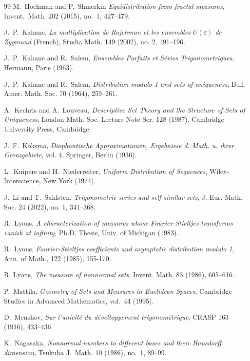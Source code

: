 \documentclass[12pt, twoside]{article}
\theoremstyle{definition}
\numberwithin{equation}{section}
\begin{document}
\begin{thebibliography}{99}
M.~Hochman and P.~Shmerkin 
{\em{Equidistribution from fractal measures}}, 
Invent.~Math. 202 (2015), no.~1, 427--479.  

J.~P.~Kahane, 
{\em{La multiplication de Rajchman et les ensembles $U(\varepsilon)$ de Zygmund}} (French),
Studia Math. 149 (2002), no. 2, 191--196. 

J.~P.~Kahane and R.~Salem,
{\em{Ensembles Parfaits et S\'eries Trigonometriques}}, 
Hermann, Paris (1963). 

J.~P.~Kahane and R.~Salem, 
{\em{Distribution modulo 1 and sets of uniqueness}},
Bull. Amer. Math. Soc. 70 (1964), 259--261.

A.~Kechris and A.~Louveau,
{\em{Descriptive Set Theory and the Structure of Sets of Uniqueness}}, 
London Math. Soc. Lecture Note Ser. 128 (1987), 
Cambridge University Press, Cambridge. 

J.~F.~Koksma, 
{\em{Diophantische Approximationen, Ergebnisse d. Math. u. ihrer
Grenzgebiete}}, vol. 4, Springer, Berlin (1936).

L.~Kuipers and H.~Niederreiter, 
{\em{Uniform Distribution of Sequences}}, 
Wiley-Interscience, New York (1974).

J.~Li and T.~Sahlsten,
{\em{Trigonometric series and self-similar sets}},
J. Eur. Math. Soc. 24 (2022), no. 1, 341--368.

R.~Lyons, 
{\em{A characterization of measures whose Fourier-Stieltjes transforms vanish at infinity}}, 
Ph.D. Thesis, Univ. of Michigan (1983). 

R.~Lyons,
{\em{Fourier-Stieltjes coefficients and asymptotic distribution modulo 1}}, 
Ann. of Math., 122 (1985), 155-170. 

R. Lyons,
{\em{The measure of nonnormal sets}},
Invent. Math. 83 (1986), 605--616.

P.~Mattila, 
{\em{Geometry of Sets and Measures in Euclidean Spaces}}, 
Cambridge Studies in Advanced Mathematics, vol.~44 (1995). 

D.~Menshov, 
{\em{Sur l’unicit\'e du d\'evelloppement trigonom\'etrique}}, 
CRASP 163 (1916), 433--436.

K.~Nagasaka, 
{\em{Nonnormal numbers to different bases and their Hausdorff dimension}},
Tsukuba J.~Math. 10 (1986), no.~1, 89--99.


\end{thebibliography}
\end{document}
